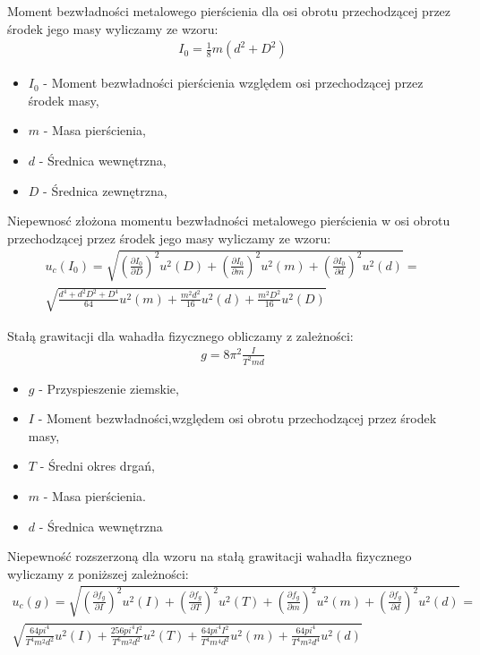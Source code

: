 \documentclass[11pt]{article}
\begin{document}
    \noindent Moment bezwładności metalowego pierścienia dla osi obrotu przechodzącej przez środek jego masy wyliczamy ze wzoru:
    \begin{gather*}
        I_0 = \frac{1}{8}m(d^2 + D^2)
    \end{gather*}
    {\footnotesize\begin{itemize}
         \setlength\itemsep{0.1em}
         \item[] $I_0$ - Moment bezwładności pierścienia względem osi przechodzącej przez środek masy,
         \item[] $m$ - Masa pierścienia,
         \item[] $d$ - Średnica wewnętrzna,
         \item[] $D$ - Średnica zewnętrzna,
    \end{itemize}}
    \noindent Niepewnosć złożona momentu bezwładności metalowego pierścienia w osi obrotu przechodzącej przez środek jego masy wyliczamy ze wzoru:
    \begin{gather*}
        u_c(I_0) = \sqrt{\left (\frac{\partial I_0}{\partial D}\right )^2u^2(D)+\left (\frac{\partial I_0}{\partial m}\right )^2u^2(m) + \left (\frac{\partial I_0}{\partial d}\right )^2u^2(d)} = \\\sqrt{\frac{d^4+d^2D^2+D^4}{64}u^2(m) + \frac{m^2d^2}{16}u^2(d) + \frac{m^2D^2}{16}u^2(D)}
    \end{gather*}

    \newpage
    \noindent Stałą grawitacji dla wahadła fizycznego obliczamy z zależności:
    \begin{gather*}
        g = 8\pi^2 \frac{I}{T^2md}
    \end{gather*}
    {\footnotesize\begin{itemize}
         \setlength\itemsep{0.1em}
         \item[] $g$ - Przyspieszenie ziemskie,
         \item[] $I$ - Moment bezwładności,względem osi obrotu przechodzącej przez środek masy,
         \item[] $T$ - Średni okres drgań,
         \item[] $m$ - Masa pierścienia.
         \item[] $d$ - Średnica wewnętrzna
    \end{itemize}}

    \noindent Niepewność rozszerzoną dla wzoru na stałą grawitacji wahadła fizycznego wyliczamy z poniższej zależności:
    \begin{gather*}
        u_c(g) = \sqrt{\left (\frac{\partial f_g}{\partial I}\right )^2u^2(I)+\left (\frac{\partial f_g}{\partial T}\right )^2u^2(T) +\left (\frac{\partial f_g}{\partial m}\right )^2u^2(m) + \left (\frac{\partial f_g}{\partial d}\right )^2u^2(d)} = \\\sqrt{\frac{64pi^4}{T^4m^2d^2}u^2(I) + \frac{256pi^4I^2}{T^6m^2d^2}u^2(T) + \frac{64pi^4I^2}{T^4m^4d^2}u^2(m) +\frac{64pi^4}{T^4m^2d^4}u^2(d)}
    \end{gather*}
    \vspace{1cm}
\end{document}
